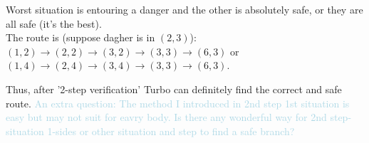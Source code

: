 \documentclass{Math_Note}
\begin{document}
\begin{sol}
\begin{enumerate}
    Worst situation is entouring a danger and the other is absolutely safe, or they are all safe (it's the best). \\
    The route is (suppose dagher is in $(2,3)$): $(1,2)\rightarrow(2,2)\rightarrow(3,2)\rightarrow(3,3)\rightarrow(6,3)$ or $(1,4)\rightarrow(2,4)\rightarrow(3,4)\rightarrow(3,3)\rightarrow(6,3)$.
\end{enumerate}
Thus, after '2-step verification' Turbo can definitely find the correct and safe route.
\newline\newline
\marginpar{\textcolor{green}{extra}}
\textcolor{lightblue}{
An extra question: The method I introduced in 2nd step 1st situation is easy but may not suit for eavry body. Is there any wonderful way for 2nd step-situation 1-sides or other situation and step to find a safe branch?
}
\end{sol}

\newpage
\end{document}

